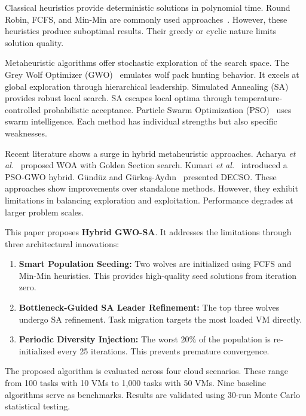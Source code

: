 \documentclass[conference]{IEEEtran}
\begin{document}
Classical heuristics provide deterministic solutions in polynomial time.
Round Robin, FCFS, and Min-Min are commonly used approaches~\cite{masdari2016overview}.
However, these heuristics produce suboptimal results.
Their greedy or cyclic nature limits solution quality.

Metaheuristic algorithms offer stochastic exploration of the search space.
The Grey Wolf Optimizer (GWO)~\cite{mirjalili2014grey} emulates wolf pack hunting behavior.
It excels at global exploration through hierarchical leadership.
Simulated Annealing (SA)~\cite{kirkpatrick1983optimization} provides robust local search.
SA escapes local optima through temperature-controlled probabilistic acceptance.
Particle Swarm Optimization (PSO)~\cite{kennedy1995particle} uses swarm intelligence.
Each method has individual strengths but also specific weaknesses.

Recent literature shows a surge in hybrid metaheuristic approaches.
Acharya \textit{et al.}~\cite{acharya2025hybrid} proposed WOA with Golden Section search.
Kumari \textit{et al.}~\cite{kumari2025hybrid} introduced a PSO-GWO hybrid.
G\"{u}nd\"{u}z and G\"{u}rka\c{s}-Ayd\i n~\cite{gunduz2025hybrid} presented DECSO.
These approaches show improvements over standalone methods.
However, they exhibit limitations in balancing exploration and exploitation.
Performance degrades at larger problem scales.

This paper proposes \textbf{Hybrid GWO-SA}.
It addresses the limitations through three architectural innovations:
\begin{enumerate}
    \item \textbf{Smart Population Seeding:} Two wolves are initialized using FCFS and Min-Min heuristics. This provides high-quality seed solutions from iteration zero.
    \item \textbf{Bottleneck-Guided SA Leader Refinement:} The top three wolves undergo SA refinement. Task migration targets the most loaded VM directly.
    \item \textbf{Periodic Diversity Injection:} The worst 20\% of the population is re-initialized every 25 iterations. This prevents premature convergence.
\end{enumerate}

The proposed algorithm is evaluated across four cloud scenarios.
These range from 100 tasks with 10 VMs to 1{,}000 tasks with 50 VMs.
Nine baseline algorithms serve as benchmarks.
Results are validated using 30-run Monte Carlo statistical testing.
\end{document}
